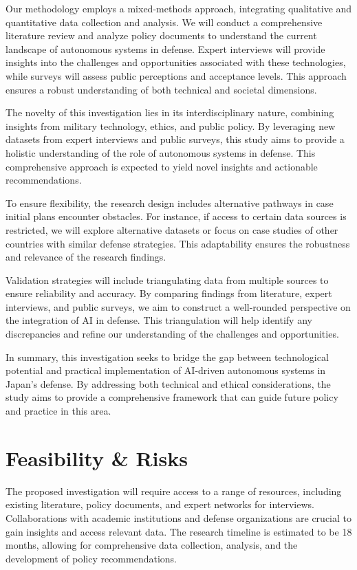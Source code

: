 \documentclass{article} %
\begin{document}
Our methodology employs a mixed-methods approach, integrating qualitative and quantitative data collection and analysis. We will conduct a comprehensive literature review and analyze policy documents to understand the current landscape of autonomous systems in defense. Expert interviews will provide insights into the challenges and opportunities associated with these technologies, while surveys will assess public perceptions and acceptance levels. This approach ensures a robust understanding of both technical and societal dimensions.

The novelty of this investigation lies in its interdisciplinary nature, combining insights from military technology, ethics, and public policy. By leveraging new datasets from expert interviews and public surveys, this study aims to provide a holistic understanding of the role of autonomous systems in defense. This comprehensive approach is expected to yield novel insights and actionable recommendations.

To ensure flexibility, the research design includes alternative pathways in case initial plans encounter obstacles. For instance, if access to certain data sources is restricted, we will explore alternative datasets or focus on case studies of other countries with similar defense strategies. This adaptability ensures the robustness and relevance of the research findings.

Validation strategies will include triangulating data from multiple sources to ensure reliability and accuracy. By comparing findings from literature, expert interviews, and public surveys, we aim to construct a well-rounded perspective on the integration of AI in defense. This triangulation will help identify any discrepancies and refine our understanding of the challenges and opportunities.

In summary, this investigation seeks to bridge the gap between technological potential and practical implementation of AI-driven autonomous systems in Japan's defense. By addressing both technical and ethical considerations, the study aims to provide a comprehensive framework that can guide future policy and practice in this area.

\section{Feasibility \& Risks}
\label{sec:feasibility}

The proposed investigation will require access to a range of resources, including existing literature, policy documents, and expert networks for interviews. Collaborations with academic institutions and defense organizations are crucial to gain insights and access relevant data. The research timeline is estimated to be 18 months, allowing for comprehensive data collection, analysis, and the development of policy recommendations.
\end{document}

